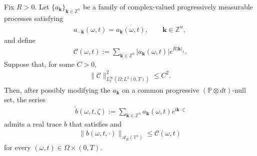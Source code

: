 \documentclass[print,wide]{draft}
\begin{document}
\begin{proposition}
\label{prop:richness-fourier}
Fix \(R>0\). Let \(\{a_{\mathbf k}\}_{\mathbf k\in\mathbb Z^n}\) be a family of complex-valued progressively measurable processes satisfying
\begin{align}\label{eq:fourier-conjugate-symmetry}
a_{-\mathbf k}(\omega,t)=\overline{a_{\mathbf k}(\omega,t)},
\qquad \mathbf k\in\mathbb Z^n,
\end{align}
and define
\begin{align}\label{eq:richness-majorant}
\mathcal C(\omega,t)
:=\sum_{\mathbf k\in\mathbb Z^n}|a_{\mathbf k}(\omega,t)|e^{R|\mathbf k|_1}.
\end{align}
Suppose that, for some \(C>0\),
\begin{align}\label{eq:richness-fourier-budget}
\|\mathcal C\|_{L^\infty_{\mathbb F}(\Omega;L^2(0,T))}^2\le C^2.
\end{align}
Then, after possibly modifying the \(a_{\mathbf k}\) on a common progressive \((\mathbb P\otimes dt)\)-null set, the series
\begin{align}\label{eq:richness-fourier-series}
\widetilde b(\omega,t,\zeta)
:=\sum_{\mathbf k\in\mathbb Z^n}a_{\mathbf k}(\omega,t)e^{\mathrm{i}\mathbf k\cdot \zeta}
\end{align}
admits a real trace \(b\) that satisfies  and
\begin{align}\label{eq:richness-beta-bound}
\|b(\omega,t,\cdot)\|_{\mathcal A_R(\mathbb T^n)}
\le \mathcal C(\omega,t)
\end{align}
for every \((\omega,t)\in\Omega\times(0,T)\).
\end{proposition}
\end{document}
